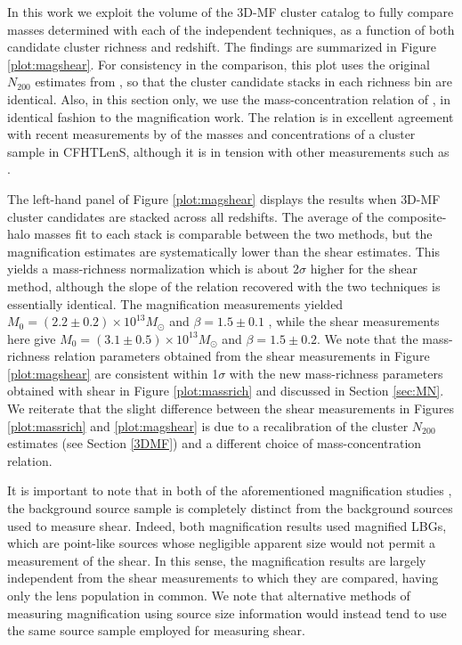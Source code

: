 In this work we exploit the volume of the \ac{3D-MF} cluster catalog to fully compare masses determined with each of the independent techniques, as a function of both candidate cluster richness and redshift. The findings are summarized in Figure \ref{plot:magshear}. For consistency in the comparison, this plot uses the original $N_{200}$ estimates from \citet{Ford14}, so that the cluster candidate stacks in each richness bin are identical. Also, in this section only, we use the mass-concentration relation of \citet{Prada12}, in identical fashion to the magnification work. The \citet{Prada12} relation is in excellent agreement with recent measurements by \citet{Covone14} of the masses and concentrations of a cluster sample in \ac{CFHTLenS}, although it is in tension with other measurements such as \citet{Merten14}. 

The left-hand panel of Figure \ref{plot:magshear} displays the results when \ac{3D-MF} cluster candidates are stacked across all redshifts. The average of the composite-halo masses fit to each stack is comparable between the two methods, but the magnification estimates are systematically lower than the shear estimates. This yields a mass-richness normalization which is about 2$\sigma$ higher for the shear method, although the slope of the relation recovered with the two techniques is essentially identical. The magnification measurements yielded $M_0 = (2.2 \pm 0.2) \times 10^{13} M_{\odot}$ and $\beta = 1.5 \pm 0.1$ \citep[see the miscentered model in][]{Ford14}, while the shear measurements here give $M_0 = (3.1 \pm 0.5) \times 10^{13} M_{\odot}$ and $\beta = 1.5 \pm 0.2$. We note that the mass-richness relation parameters obtained from the shear measurements in Figure \ref{plot:magshear} are consistent within 1$\sigma$ with the new mass-richness parameters obtained with shear in Figure \ref{plot:massrich} and discussed in Section \ref{sec:MN}. We reiterate that the slight difference between the shear measurements in Figures \ref{plot:massrich} and \ref{plot:magshear} is due to a recalibration of the cluster $N_{200}$ estimates (see Section \ref{3DMF}) and a different choice of mass-concentration relation.

It is important to note that in both of the aforementioned magnification studies \citep{Ford12,Ford14}, the background source sample is completely distinct from the background sources used to measure shear. Indeed, both magnification results used magnified \ac{LBG}s, which are point-like sources whose negligible apparent size would not permit a measurement of the shear. In this sense, the magnification results are largely independent from the shear measurements to which they are compared, having only the lens population in common. We note that alternative methods of measuring magnification using source size information would instead tend to use the same source sample employed for measuring shear.


